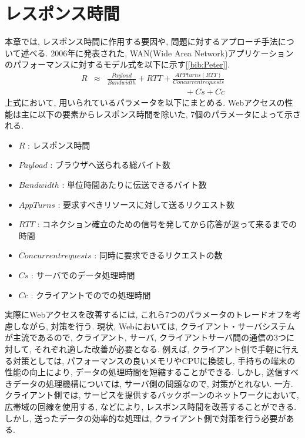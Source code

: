 \documentclass[twocolumn]{jsarticle}
\begin{document}
\section{レスポンス時間}
本章では, レスポンス時間に作用する要因や, 問題に対するアプローチ手法について述べる.
2006年に発表された,
WAN(Wide Area Network)アプリケーションのパフォーマンスに対するモデル式を以下に示す[\ref{bib:Peter}].
\begin{eqnarray}
R &\approx& \frac{Payload}{Bandwidth} + RTT +
\frac{APPturns(RTT)}{Concurrentrequests} \nonumber \\
&& \hspace{4cm} + Cs + Cc
\label{eq:performance}
\end{eqnarray}
上式において, 用いられているパラメータを以下にまとめる.
Webアクセスの性能は主に以下の要素からレスポンス時間を除いた, 7個のパラメータによって示される.
\begin{itemize}
  \item $R$ : レスポンス時間
  \item $Payload$ : ブラウザへ送られる総バイト数
  \item $Bandwidth$ : 単位時間あたりに伝送できるバイト数
  \item $AppTurns$ : 要求すべきリソースに対して送るリクエスト数
  \item $RTT$ : コネクション確立のための信号を発してから応答が返って来るまでの時間
  \item $Concurrent requests$ : 同時に要求できるリクエストの数
  \item $Cs$ : サーバでのデータ処理時間
  \item $Cc$ : クライアントでのでの処理時間
\end{itemize}
実際にWebアクセスを改善するには, これら7つのパラメータのトレードオフを考慮しながら, 対策を行う.
現状, Webにおいては, クライアント・サーバシステムが主流であるので, クライアント, サーバ, クライアントサーバ間の通信の3つに対して,
それぞれ適した改善が必要となる.
例えば, クライアント側で手軽に行える対策としては, パフォーマンスの良いメモリやCPUに換装し, 手持ちの端末の性能の向上により,
データの処理時間を短縮することができる.
しかし, 送信すべきデータの処理機構については, サーバ側の問題なので, 対策がとれない.
一方. クライアント側では, サービスを提供するバックボーンのネットワークにおいて, 広帯域の回線を使用する, などにより,
レスポンス時間を改善することができる.
しかし, 送ったデータの効率的な処理は, クライアント側で対策を行う必要がある.
\end{document}
